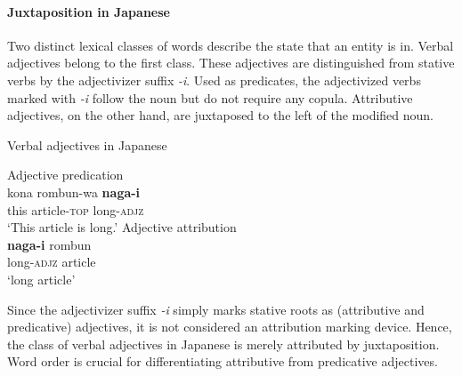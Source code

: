 \paragraph{Juxtaposition in Japanese}
Two distinct lexical classes of words describe the state that an entity is in. Verbal adjectives belong to the first class. These adjectives are distinguished from stative verbs by the adjectivizer suffix \textit{-i}. Used as predicates, the adjectivized verbs marked with \textit{-i} follow the noun but do not require any copula. Attributive adjectives, on the other hand, are juxtaposed to the left of the modified noun. 
\begin{exe}
\ex \rm{Verbal adjectives in Japanese \citep[170]{backhouse1984}}
\begin{xlist}
\ex \rm{Adjective predication}\\
\gll	kona rombun-wa \textbf{naga-i}\\
	this article-\textsc{top} long-\textsc{adjz}\\%
\glt	‘This article is long.’
\ex \rm{Adjective attribution}\\
\gll	\textbf{naga-i} rombun\\
	long-\textsc{adjz} article\\
\glt	‘long article’
\end{xlist}
\end{exe}
Since the adjectivizer suffix \textit{-i} simply marks stative roots as (attributive and predicative) adjectives, it is not considered an attribution marking device. Hence, the class of verbal adjectives in Japanese is merely attributed by juxtaposition. Word order is crucial for differentiating attributive from predicative adjectives. 


